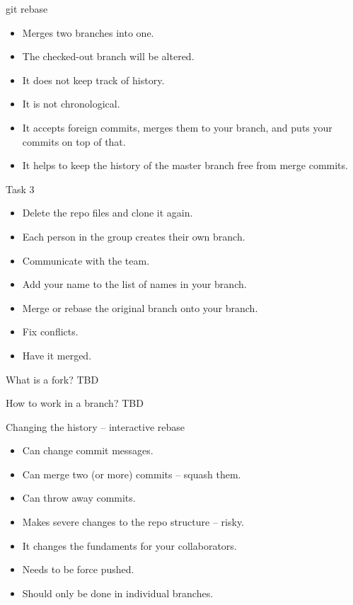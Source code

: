 \documentclass[14pt]{beamer}
\begin{document}
	\begin{frame}{git rebase}
	\begin{itemize}
		\item Merges two branches into one.
		\item The checked-out branch will be altered.
		\item It does not keep track of history.
		\item It is not chronological.
		\item It accepts foreign commits, merges them to your branch, and puts your commits on top of that.
		\item It helps to keep the history of the master branch free from merge commits.
	\end{itemize}
\end{frame}


	\begin{frame}{Task 3}
	\begin{itemize}
		\item Delete the repo files and clone it again.
		\item Each person in the group creates their own branch.
		\item Communicate with the team.
		\item Add your name to the list of names in your branch.
		\item Merge or rebase the original branch onto your branch.
		\item Fix conflicts.
		\item Have it merged.
	\end{itemize}
	\end{frame}


 \begin{frame}{What is a fork?}
 	TBD
 \end{frame}

\begin{frame}{How to work in a branch?}
	TBD
\end{frame}

	\begin{frame}{Changing the history -- interactive rebase}
	\begin{itemize}
		\item Can change commit messages.
		\item Can merge two (or more) commits -- squash them.
		\item Can throw away commits.
		\item Makes severe changes to the repo structure -- risky.
		\item It changes the fundaments for your collaborators.
		\item Needs to be force pushed.
		\item Should only be done in individual branches.
	\end{itemize}
\end{frame}
\end{document}
